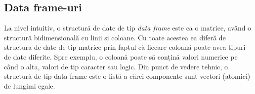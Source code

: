 \documentclass[]{article}
\newenvironment{Shaded}{\begin{snugshade}}{\end{snugshade}}
\newcommand{\DataTypeTok}[1]{\textcolor[rgb]{0.13,0.29,0.53}{#1}}
\newcommand{\DecValTok}[1]{\textcolor[rgb]{0.00,0.00,0.81}{#1}}
\newcommand{\ErrorTok}[1]{\textcolor[rgb]{0.64,0.00,0.00}{\textbf{#1}}}
\newcommand{\KeywordTok}[1]{\textcolor[rgb]{0.13,0.29,0.53}{\textbf{#1}}}
\newcommand{\NormalTok}[1]{#1}
\newcommand{\OperatorTok}[1]{\textcolor[rgb]{0.81,0.36,0.00}{\textbf{#1}}}
\newcommand{\OtherTok}[1]{\textcolor[rgb]{0.56,0.35,0.01}{#1}}
\newcommand{\StringTok}[1]{\textcolor[rgb]{0.31,0.60,0.02}{#1}}
\begin{document}
\begin{Shaded}
\end{Shaded}

\hypertarget{data-frame-uri}{%
\subsection{Data frame-uri}\label{data-frame-uri}}

La nivel intuitiv, o structură de date de tip \emph{data frame} este ca
o matrice, având o structură bidimensională cu linii și coloane. Cu
toate acestea ea diferă de structura de date de tip matrice prin faptul
că fiecare coloană poate avea tipuri de date diferite. Spre exemplu, o
coloană poate să conțină valori numerice pe când o alta, valori de tip
caracter sau logic. Din punct de vedere tehnic, o structură de tip data
frame este o listă a cărei componente sunt vectori (atomici) de lungimi
egale.
\end{document}
